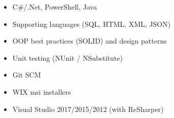 \begin{multicols}{2}
	\begin{itemize}
		\item C\#/.Net, PowerShell, Java
		\item Supporting languages (SQL, HTML, XML, JSON)
		\item OOP best practices (SOLID) and design patterns
		\item Unit testing (NUnit / NSubstitute)
		\item Git SCM
		\item WIX msi installers
		\item Visual Studio 2017/2015/2012 (with ReSharper)
	\end{itemize}
	\vspace*{\fill}
\end{multicols}